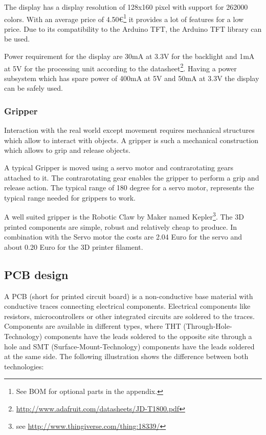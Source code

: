 \documentclass[11pt,a4paper]{article}
\begin{document}
The display has a display resolution of 128x160 pixel with support for 262000 colors. With an average price of 4.50\euro\footnote{See BOM for optional parts in the appendix.} it provides a lot of features for a low price. Due to its compatibility to the Arduino TFT, the Arduino TFT library can be used.

Power requirement for the display are 30mA at 3.3V for the backlight and 1mA at 5V for the processing unit according to the datasheet\footnote{\url{http://www.adafruit.com/datasheets/JD-T1800.pdf}}. Having a power subsystem which has spare power of 400mA at 5V and 50mA at 3.3V the display can be safely used.

\subsubsection{Gripper}
Interaction with the real world except movement requires mechanical structures which allow to interact with objects. A gripper is such a mechanical construction which allows to grip and release objects.

A typical Gripper is moved using a servo motor and contrarotating gears attached to it. The contrarotating gear enables the gripper to perform a grip and release action. The typical range of 180 degree for a servo motor, represents the typical range needed for grippers to work. 

A well suited gripper is the Robotic Claw by Maker named Kepler\footnote{see \url{http://www.thingiverse.com/thing:18339/}}. The 3D printed components are simple, robust and relatively cheap to produce. In combination with the Servo motor the costs are 2.04 Euro for the servo and about 0.20 Euro for the 3D printer filament.


\subsection{PCB design} 
A PCB (short for printed circuit board) is a non-conductive base material with conductive traces connecting electrical components. Electrical components like resistors, microcontrollers or other integrated circuits are soldered to the traces. Components are available in different types, where THT (Through-Hole-Technology) components have the leads soldered to the opposite site through a hole and SMT (Surface-Mount-Technology) components have the leads soldered at the same side. The following illustration shows the difference between both technologies:
\end{document}
